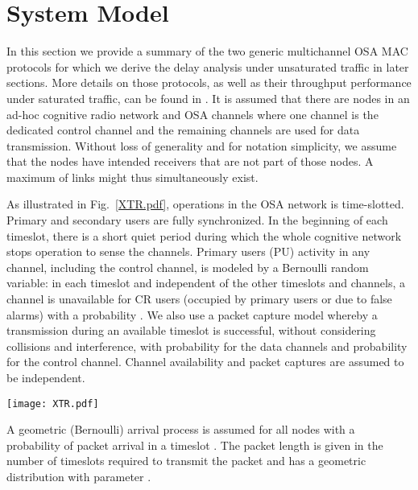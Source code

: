 \documentclass[12pt,journal,oneside,onecolumn]{IEEEtran}
\begin{document}
\section{System Model}
\label {sec:system-model}
In this section we provide a summary of the two generic multichannel OSA MAC protocols for which we derive the delay analysis under unsaturated traffic in later sections. More details on those protocols, as well as their throughput performance under saturated traffic, can be found in \cite{pawelczak09,park11}.
It is assumed that there are  nodes in an ad-hoc cognitive radio network and  OSA channels where one channel is the dedicated control channel and the remaining  channels are used for data transmission. Without loss of generality and for notation simplicity, we assume that the  nodes have intended receivers that are not part of those nodes. 
A maximum of  links might thus simultaneously exist. 

As illustrated in Fig.~\ref{XTR.pdf}, operations in the OSA network is time-slotted. Primary and secondary users are fully synchronized. 
In the beginning of each timeslot, there is a short quiet period during which the whole cognitive network stops operation to sense the channels. 
Primary users (PU) activity in any channel, including the control channel, is modeled by a Bernoulli random variable: in each timeslot 
and independent of the other timeslots and channels, a channel is unavailable for CR users (occupied by primary users or due to false alarms) 
with a probability . We also use a packet capture model whereby a transmission during an available timeslot is successful, 
without considering collisions and interference, with  probability  for the data channels and probability  
for the control channel. Channel availability and packet captures are assumed to be independent.
\begin{figure*}\centering 
\texttt{[image: XTR.pdf]}\caption{An example of the reservation and transmission processes. In the buffering model, a node reserves channel  in three timeslots (). The transmission of a packet with the length 2 (timeslots) takes 4 timeslots to finish (). The service time for this packet is thus  timeslots. In the buffering model, after a channel unavailability in the second timeslot of the transmission on Ch1, the node participates in a new competition and reserve Ch2 after two timeslots. We thus have .}\label{XTR.pdf}\end{figure*}

A geometric (Bernoulli) arrival process is assumed for all nodes with a probability of packet arrival in a timeslot . The packet length  is given in the number of timeslots required to transmit the packet and has a geometric distribution with parameter .
\end{document}
